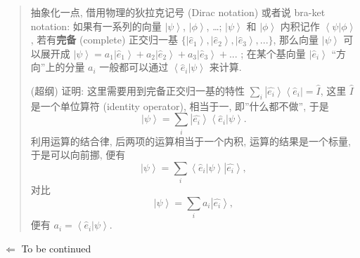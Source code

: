 \begin{quote}
抽象化一点, 借用物理的狄拉克记号 (Dirac notation) 或者说 bra-ket
notation: 如果有一系列的向量 \(\left|\psi\right>\),
\(\left|\phi\right>\), \ldots; \(\left|\psi\right>\) 和
\(\left|\phi\right>\) 内积记作 \(\left<\psi\right.\left|\phi\right>\),
若有\textbf{完备} (complete) 正交归一基
\(\{\left|\hat{e}_1\right>,\left|\hat{e}_2\right>,\left|\hat{e}_3\right>,...\}\),
那么向量 \(\left|\psi\right>\) 可以展开成
\(\left|\psi\right>=a_1\left|\hat{e}_1\right>+a_2\left|\hat{e}_2\right>+a_3\left|\hat{e}_3\right>+...\)
; 在某个基向量 \(\left|\hat{e}_i\right>\) ``方向''上的分量 \(a_i\)
一般都可以通过 \(\left<\hat{e}_i\right.\left|\psi\right>\) 来计算.

(超纲) 证明: 这里需要用到完备正交归一基的特性
\(\sum_i\left|\hat{e_i}\right>\left<\hat{e}_i\right|=\hat{I}\), 这里
\(\hat{I}\) 是一个单位算符 (identity operator), 相当于一,
即''什么都不做'', 于是 \[
\left|\psi\right>=\sum_i\left|\hat{e_i}\right>\left<\hat{e}_i\right.\left|\psi\right>.
\] 利用运算的结合律, 后两项的运算相当于一个内积, 运算的结果是一个标量,
于是可以向前挪, 便有 \[
\left|\psi\right>=\sum_i\left<\hat{e}_i\right.\left|\psi\right>\left|\hat{e_i}\right>,
\] 对比 \[
\left|\psi\right>=\sum_ia_i\left|\hat{e_i}\right>,
\] 便有 \(a_i=\left<\hat{e}_i\right.\left|\psi\right>\).
\end{quote}

\(\Leftarrow\) To be continued
